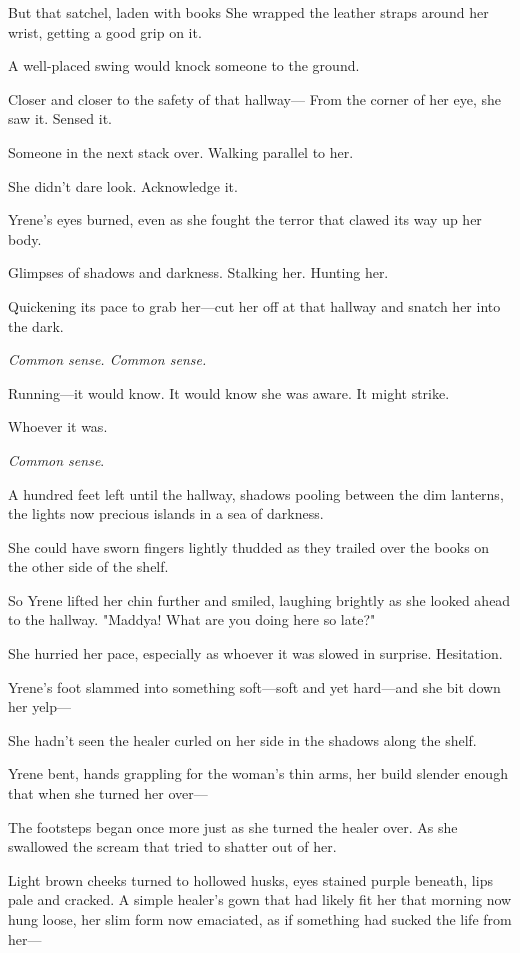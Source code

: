 But that satchel, laden with books  She wrapped the leather straps around her wrist, getting a good grip on it.

A well-placed swing would knock someone to the ground.

Closer and closer to the safety of that hallway--- From the corner of her eye, she saw it. Sensed it.

Someone in the next stack over. Walking parallel to her.

She didn't dare look. Acknowledge it.

Yrene's eyes burned, even as she fought the terror that clawed its way up her body.

Glimpses of shadows and darkness. Stalking her. Hunting her.

Quickening its pace to grab her---cut her off at that hallway and snatch her into the dark.

\emph{Common sense. Common sense.}

Running---it would know. It would know she was aware. It might strike.

Whoever it was.

\emph{Common sense}.

A hundred feet left until the hallway, shadows pooling between the dim lanterns, the lights now precious islands in a sea of darkness.

She could have sworn fingers lightly thudded as they trailed over the books on the other side of the shelf.

So Yrene lifted her chin further and smiled, laughing brightly as she looked ahead to the hallway. "Maddya! What are you doing here so late?"

She hurried her pace, especially as whoever it was slowed in surprise. Hesitation.

Yrene's foot slammed into something soft---soft and yet hard---and she bit down her yelp---

She hadn't seen the healer curled on her side in the shadows along the shelf.

Yrene bent, hands grappling for the woman's thin arms, her build slender enough that when she turned her over---

The footsteps began once more just as she turned the healer over. As she swallowed the scream that tried to shatter out of her.

Light brown cheeks turned to hollowed husks, eyes stained purple beneath, lips pale and cracked. A simple healer's gown that had likely fit her that morning now hung loose, her slim form now emaciated, as if something had sucked the life from her---

